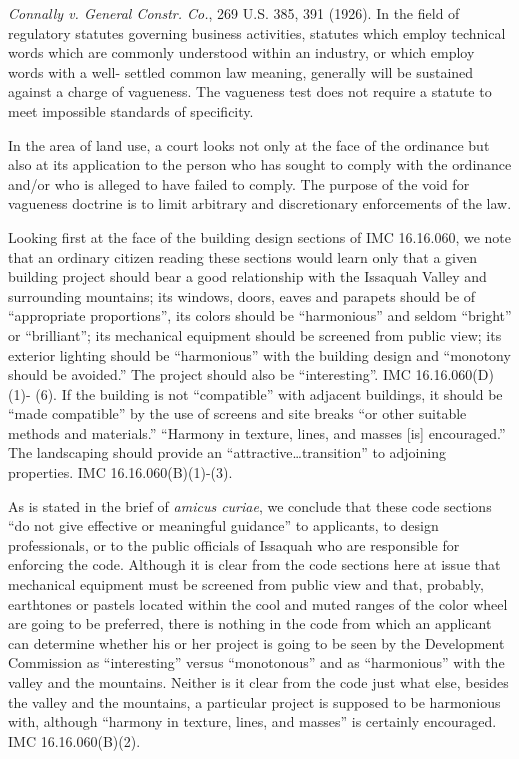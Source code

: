\emph{Connally v. General Constr. Co.}, 269 U.S. 385, 391 (1926). In the field
of regulatory statutes governing business activities, statutes which employ
technical words which are commonly understood within an industry, or which
employ words with a well- settled common law meaning, generally will be
sustained against a charge of vagueness. The vagueness test does not require a
statute to meet impossible standards of specificity.

In the area of land use, a court looks not only at the face of the ordinance but
also at its application to the person who has sought to comply with the
ordinance and/or who is alleged to have failed to comply. The purpose of the
void for vagueness doctrine is to limit arbitrary and discretionary enforcements
of the law.

Looking first at the face of the building design sections of IMC 16.16.060, we
note that an ordinary citizen reading these sections would learn only that a
given building project should bear a good relationship with the Issaquah Valley
and surrounding mountains; its windows, doors, eaves and parapets should be of
``appropriate proportions'', its colors should be ``harmonious'' and seldom
``bright'' or ``brilliant''; its mechanical equipment should be screened from
public view; its exterior lighting should be ``harmonious'' with the building
design and ``monotony should be avoided.'' The project should also be
``interesting''. IMC 16.16.060(D)(1)- (6). If the building is not ``compatible''
with adjacent buildings, it should be ``made compatible'' by the use of screens
and site breaks ``or other suitable methods and materials.'' ``Harmony in
texture, lines, and masses [is] encouraged.'' The landscaping should provide an
``attractive\ldots transition'' to adjoining properties. IMC
16.16.060(B)(1)-(3).

As is stated in the brief of \emph{amicus curiae}, we conclude that these code
sections ``do not give effective or meaningful guidance'' to applicants, to
design professionals, or to the public officials of Issaquah who are responsible
for enforcing the code. Although it is clear from the code sections here at
issue that mechanical equipment must be screened from public view and that,
probably, earthtones or pastels located within the cool and muted ranges of the
color wheel are going to be preferred, there is nothing in the code from which
an applicant can determine whether his or her project is going to be seen by the
Development Commission as ``interesting'' versus ``monotonous'' and as
``harmonious'' with the valley and the mountains. Neither is it clear from the
code just what else, besides the valley and the mountains, a particular project
is supposed to be harmonious with, although ``harmony in texture, lines, and
masses'' is certainly encouraged. IMC 16.16.060(B)(2).

